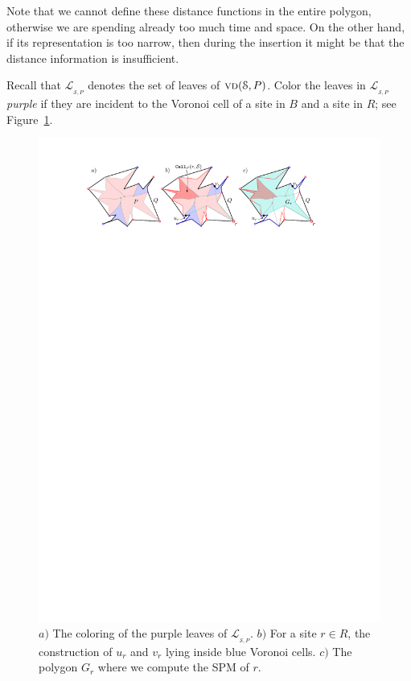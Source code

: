 \documentclass[a4paper,UKenglish]{socg-lipics-v2018}
\newcommand{\s}{\mathcal S}
\newcommand{\vd}[2][P]{\textsc{vd}(#2, #1)}
\newcommand{\LL}[1][\s, P]{\ensuremath{\mathcal L_{_{#1}}}}
\begin{document}
Note that we cannot define these distance functions in the entire polygon, otherwise we are spending already too much time and space.
On the other hand, if its representation is too narrow, then during the insertion it might be that the distance information is insufficient.

Recall that $\LL$ denotes the set of leaves of $\vd{\s}$.
Color the leaves in $\LL$ \emph{purple} if they are incident to the Voronoi cell of a site in $B$ and a site in $R$; see Figure~\ref{fig:RedPreprocessing}.


\begin{figure}[ht]
\centering
\includegraphics{imgRedPreprocessing.pdf}
\caption{$a)$ The coloring of the purple leaves of $\LL$.
$b)$ For a site $r\in R$, the construction of $u_r$ and $v_r$ lying inside blue Voronoi cells.
$c)$ The polygon $G_r$ where we compute the SPM of $r$.}
\label{fig:RedPreprocessing}
\end{figure}
\end{document}
